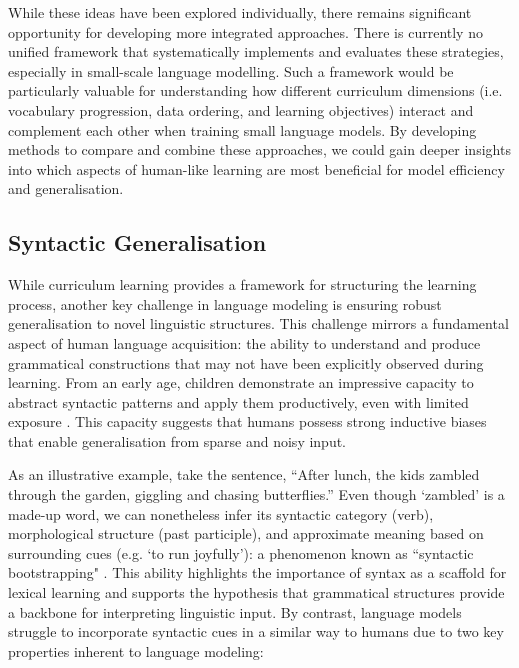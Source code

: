 \vspace{1em}

While these ideas have been explored individually, there remains significant opportunity for developing more integrated approaches. There is currently no unified framework that systematically implements and evaluates these strategies, especially in small-scale language modelling. Such a framework would be particularly valuable for understanding how different curriculum dimensions (i.e. vocabulary progression, data ordering, and learning objectives) interact and complement each other when training small language models. By developing methods to compare and combine these approaches, we could gain deeper insights into which aspects of human-like learning are most beneficial for model efficiency and generalisation.

\subsection{Syntactic Generalisation}

While curriculum learning provides a framework for structuring the learning process, another key challenge in language modeling is ensuring robust generalisation to novel linguistic structures. This challenge mirrors a fundamental aspect of human language acquisition: the ability to understand and produce grammatical constructions that may not have been explicitly observed during learning. From an early age, children demonstrate an impressive capacity to abstract syntactic patterns and apply them productively, even with limited exposure \citep{yang2013poverty, legate2002empirical}. This capacity suggests that humans possess strong inductive biases that enable generalisation from sparse and noisy input.

As an illustrative example, take the sentence, ``After lunch, the kids zambled through the garden, giggling and chasing butterflies.'' Even though `zambled' is a made-up word, we can nonetheless infer its syntactic category (verb), morphological structure (past participle), and approximate meaning based on surrounding cues (e.g. `to run joyfully'): a phenomenon known as ``syntactic bootstrapping" \citep{gleitman1990structural, naigles1990children}. This ability highlights the importance of syntax as a scaffold for lexical learning and supports the hypothesis that grammatical structures provide a backbone for interpreting linguistic input. By contrast, language models struggle to incorporate syntactic cues in a similar way to humans due to two key properties inherent to language modeling:

